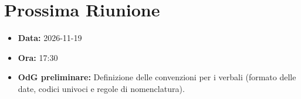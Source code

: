 \documentclass[a4paper, 11pt]{article}
\begin{document}
\vspace{0.5cm}
\section{Prossima Riunione}
\begin{itemize}
    \item \textbf{Data:}  2026-11-19
    \item \textbf{Ora:} 17:30
    \item \textbf{OdG preliminare:} Definizione delle convenzioni per i verbali (formato delle date, codici univoci e regole di nomenclatura).
\end{itemize}
\end{document}
